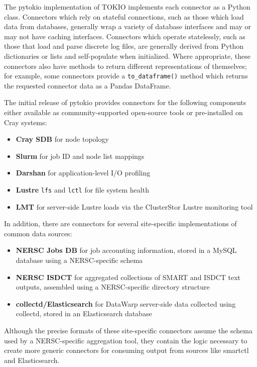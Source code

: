 The pytokio implementation of TOKIO implements each connector as a Python class.
Connectors which rely on stateful connections, such as those which load data from databases, generally wrap a variety of database interfaces and may or may not have caching interfaces.
Connectors which operate statelessly, such as those that load and parse discrete log files, are generally derived from Python dictionaries or lists and self-populate when initialized.
Where appropriate, these connectors also have methods to return different representations of themselves; for example, some connectors provide a \texttt{to\_dataframe()} method which returns the requested connector data as a Pandas DataFrame.

The initial release of pytokio provides connectors for the following components either available as community-supported open-source tools or pre-installed on Cray systems:

\begin{itemize}
\item \textbf{Cray SDB} for node topology
\item \textbf{Slurm} for job ID and node list mappings
\item \textbf{Darshan} for application-level I/O profiling
\item \textbf{Lustre} \texttt{lfs} and \texttt{lctl} for file system health
\item \textbf{LMT} for server-side Lustre loads via the ClusterStor Lustre monitoring tool~\cite{Keopp2014}
\end{itemize}

In addition, there are connectors for several site-specific implementations of common data sources:

\begin{itemize}
\item \textbf{NERSC Jobs DB} for job accounting information, stored in a MySQL database using a NERSC-specific schema
\item \textbf{NERSC ISDCT} for aggregated collections of SMART and ISDCT text outputs, assembled using a NERSC-specific directory structure
\item \textbf{collectd/Elasticsearch} for DataWarp server-side data collected using collectd, stored in an Elasticsearch database
\end{itemize}

Although the precise formats of these site-specific connectors assume the schema used by a NERSC-specific aggregation tool, they contain the logic necessary to create more generic connectors for consuming output from sources like smartctl and Elasticsearch.


